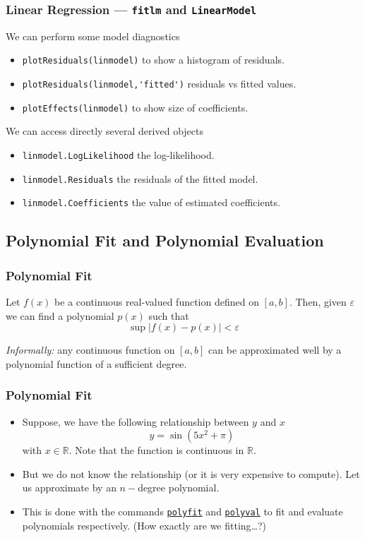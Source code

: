 \documentclass[11pt,xcolor={svgnames},aspectratio=169,usepdftitle=false,notheorems]{beamer}
\begin{document}
\begin{frame}[fragile]
  \frametitle{Linear Regression --- \texttt{fitlm} and \texttt{LinearModel}}
We can perform some model diagnostics
\begin{itemize}
  \item \verb;plotResiduals(linmodel); to show a histogram of residuals.
  \item \verb;plotResiduals(linmodel,'fitted'); residuals vs fitted values.
  \item \verb;plotEffects(linmodel); to show size of coefficients.
\end{itemize}
We can access directly several derived objects
\begin{itemize}
  \item \verb;linmodel.LogLikelihood; the log-likelihood.
  \item \verb;linmodel.Residuals; the residuals of the fitted model.
  \item \verb;linmodel.Coefficients; the value of estimated coefficients.
\end{itemize}
\end{frame}

\subsection{Polynomial Fit and Polynomial Evaluation}

\begin{frame}
  \frametitle{Polynomial Fit}
\begin{theorem}
Let $f(x)$ be a continuous real-valued function defined on $[a,b]$. Then, given $\varepsilon$ we can find a polynomial $p(x)$ such that
\[
\sup \lvert f(x) - p(x) \rvert < \varepsilon  
\]
\end{theorem}
\textit{Informally:} any continuous function on $[a,b]$ can be approximated well by a polynomial function of a sufficient degree.
\end{frame}

\begin{frame}
  \frametitle{Polynomial Fit}
\begin{itemize}
  \item Suppose, we have the following relationship between $y$ and $x$
  \[
  y = \sin(5x^2 + \pi)
  \]
  with $x\in\mathbb{R}$. Note that the function is continuous in $\mathbb{R}$.
  \item But we do not know the relationship (or it is very expensive to compute). Let us approximate by an $n-$degree polynomial.
  \item This is done with the commands \href{https://www.mathworks.com/help/matlab/ref/polyfit.html}{\texttt{polyfit}} and \href{https://www.mathworks.com/help/matlab/ref/polyval.html}{\texttt{polyval}} to fit and evaluate polynomials respectively. \footnotesize (How exactly are we fitting\ldots ?)
\end{itemize}
\end{frame}
\end{document}
